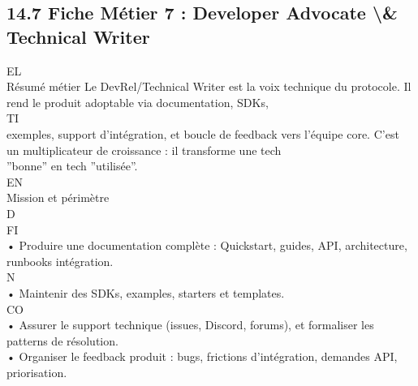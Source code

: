 \subsection{14.7 Fiche Métier 7 : Developer Advocate \textbackslash{}& Technical Writer}
\vspace{0.5em}
\vspace{0.5em}
\vspace{0.5em}
\vspace{0.5em}
EL\\
Résumé métier Le DevRel/Technical Writer est la voix technique du protocole. Il rend le produit adoptable via documentation, SDKs,\\
\vspace{0.5em}
\vspace{0.5em}
\vspace{0.5em}
\vspace{0.5em}
TI\\
exemples, support d’intégration, et boucle de feedback vers l’équipe core. C’est un multiplicateur de croissance : il transforme une tech\\
”bonne” en tech ”utilisée”.\\
\vspace{0.5em}
\vspace{0.5em}
\vspace{0.5em}
\vspace{0.5em}
EN\\
Mission et périmètre\\
\vspace{0.5em}
\vspace{0.5em}
\vspace{0.5em}
\vspace{0.5em}
D\\
FI\\
• Produire une documentation complète : Quickstart, guides, API, architecture, runbooks intégration.\\
\vspace{0.5em}
N\\
• Maintenir des SDKs, examples, starters et templates.\\
CO\\
• Assurer le support technique (issues, Discord, forums), et formaliser les patterns de résolution.\\
\vspace{0.5em}
• Organiser le feedback produit : bugs, frictions d’intégration, demandes API, priorisation.\\
\vspace{0.5em}

